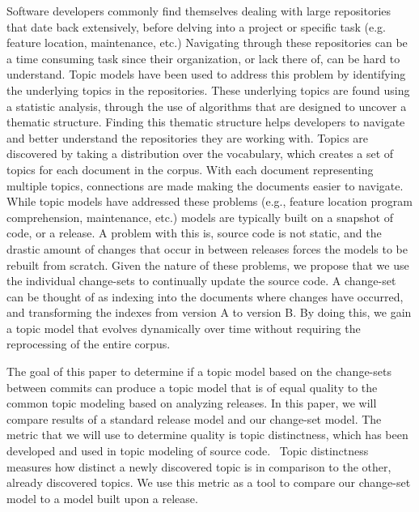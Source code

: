 Software developers commonly find themselves dealing with large repositories that date back extensively, before delving into a project or specific task (e.g. feature location, maintenance, etc.)
Navigating through these repositories can be a time consuming task since their organization, or lack there of, can be hard to understand.
Topic models have been used to address this problem by identifying the underlying topics in the repositories.
These underlying topics are found using a statistic analysis, through the use of algorithms that are designed to uncover a thematic structure.
Finding this thematic structure helps developers to navigate and better understand the repositories they are working with.
Topics are discovered by taking a distribution over the vocabulary, which creates a set of topics for each document in the corpus.
With each document representing multiple topics, connections are made making the documents easier to navigate.
While topic models have addressed these problems (e.g., feature location program comprehension, maintenance, etc.) models are typically built on a snapshot of code, or a release.
A problem with this is, source code is not static, and the drastic amount of changes that occur in between releases forces the models to be rebuilt from scratch.
Given the nature of these problems, we propose that we use the individual change-sets to continually update the source code.
A change-set can be thought of as indexing into the documents where changes have occurred, and transforming the indexes from version A to version B.
By doing this, we gain a topic model that evolves dynamically over time without requiring the reprocessing of the entire corpus.

The goal of this paper to determine if a topic model based on the change-sets between commits can produce a topic model that is of equal quality to the common topic modeling based on analyzing releases.
In this paper, we will compare results of a standard release model and our change-set model.
The metric that we will use to determine quality is topic distinctness, which has been developed and used in topic modeling of source code.~\cite{Thomas-etal:2011}
Topic distinctness measures how distinct a newly discovered topic is in comparison to the other, already discovered topics.
We use this metric as a  tool to compare our change-set model to a model built upon a release.





